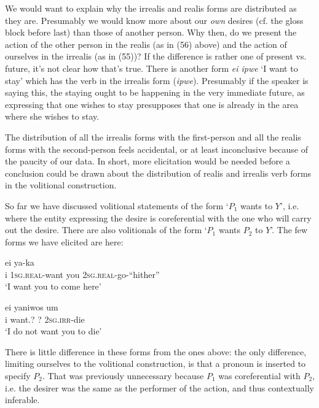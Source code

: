 \documentclass[pdftex,12pt,letterpaper]{article}
\let\ipa\textipa
\begin{document}
 We would want to explain why the irrealis and realis forms are distributed as they are. Presumably we would know more about our \emph{own} desires (cf. the gloss block before last) than those of another person. Why then, do we present the action of the other person in the realis (as in (56) above) and the action of ourselves in the irrealis (as in (55))? If the difference is rather one of present vs. future, it's not clear how that's true. There is another form \emph{ei \ipa{y@ka} ipwe} `I want to stay' which has the verb in the irrealis form (\emph{ipwe}). Presumably if the speaker is saying this, the staying ought to be happening in the very immediate future, as expressing that one wishes to stay presupposes that one is already in the area where she wishes to stay. 
 
 The distribution of all the irrealis forms with the first-person and all the realis forms with the second-person feels accidental, or at least inconclusive because of the paucity of our data. In short, more elicitation would be needed before a conclusion could be drawn about the distribution of realis and irrealis verb forms in the volitional construction.
 
 So far we have discussed volitional statements of the form `$P_1$ wants to $Y$', i.e. where the entity expressing the desire is coreferential with the one who will carry out the desire. There are also volitionals of the form `$P_1$ wants $P_2$ to $Y$'. The few forms we have elicited are here:
 
 \begin{exe}
 \ex
 \gll ei ya-ka \ipa{\textltailn@} \ipa{\textltailn@-nak-i} \\
 i \textsc{1sg.real}-want you \textsc{2sg.real}-go-``hither'' \\
 \trans `I want you to come here'
 
 \ex
 \gll ei yaniwos um \ipa{\textltailn@} \ipa{\textltailn u-g@k} \\
 i want.? ? \textsc{2sg.irr}-die \\
 \trans `I do not want you to die'
 \end{exe}

\noindent There is little difference in these forms from the ones above: the only difference, limiting ourselves to the volitional construction, is that a pronoun is inserted to specify $P_2$. That was previously unnecessary because $P_1$ was coreferential with $P_2$, i.e. the desirer was the same as the performer of the action, and thus contextually inferable.
\end{document}
